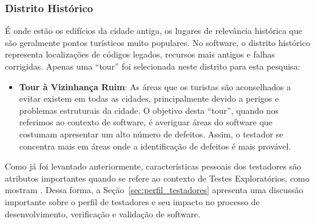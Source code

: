 \subsubsection{Distrito Histórico}

É onde estão os edifícios da cidade antiga, os lugares de relevância histórica que são geralmente pontos turísticos muito populares. No software, o distrito histórico representa localizações de códigos legados, recursos mais antigos e falhas corrigidas. Apenas uma ``tour'' foi selecionada neste distrito para esta pesquisa:

\begin{itemize}
    \item \textbf {Tour à Vizinhança Ruim}: As áreas que os turistas são aconselhados a evitar existem em todas as cidades, principalmente devido a perigos e problemas estruturais da cidade. O objetivo desta ``tour'', quando nos referimos ao contexto de software, é averiguar áreas do software que costumam apresentar um alto número de defeitos. Assim, o testador se concentra mais em áreas onde a identificação de defeitos é mais provável.
\end{itemize}





Como já foi levantado anteriormente, características pessoais dos testadores são atributos importantes quando se refere ao contexto de Testes Exploratórios, como mostram \cite{whittaker2009exploratory, itkonen2015test, itkonen2012role, itkonen2005exploratory}. Dessa forma, a Seção~\ref{sec:perfil_testadores} apresenta uma discussão importante sobre o perfil de testadores e seu impacto no processo de desenvolvimento, verificação e validação de software.